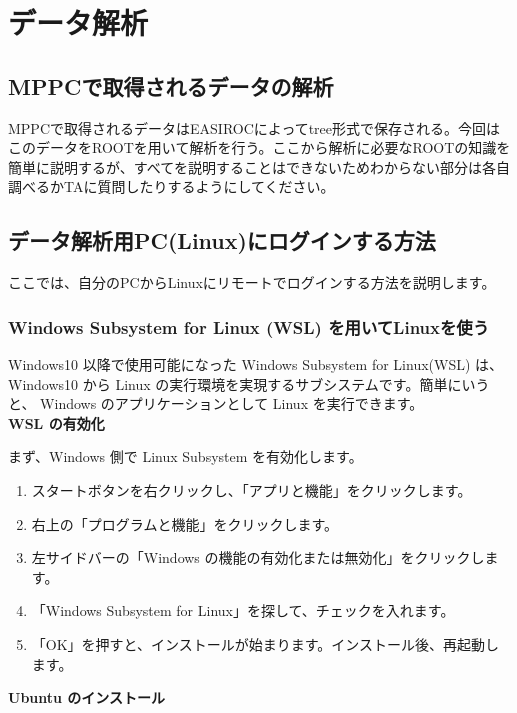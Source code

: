 \documentclass[10pt,a4j]{jarticle}
\begin{document}
\section{データ解析}
\subsection{MPPCで取得されるデータの解析}
MPPCで取得されるデータはEASIROCによってtree形式で保存される。今回はこのデータをROOTを用いて解析を行う。ここから解析に必要なROOTの知識を簡単に説明するが、すべてを説明することはできないためわからない部分は各自調べるかTAに質問したりするようにしてください。

\subsection{データ解析用PC(Linux)にログインする方法}
ここでは、自分のPCからLinuxにリモートでログインする方法を説明します。

\subsubsection{Windows Subsystem for Linux (WSL) を用いてLinuxを使う}
Windows10 以降で使用可能になった Windows Subsystem for Linux(WSL) は、 Windows10 から Linux の実行環境を実現するサブシステムです。簡単にいうと、 Windows のアプリケーションとして Linux を実行できます。\\

\vspace{1cm}
{\Large \bf WSL の有効化}
\vspace{0.5cm}

まず、Windows 側で Linux Subsystem を有効化します。
\begin{enumerate}
\item スタートボタンを右クリックし、「アプリと機能」をクリックします。
\item 右上の「プログラムと機能」をクリックします。
\item 左サイドバーの「Windows の機能の有効化または無効化」をクリックします。
\item 「Windows Subsystem for Linux」を探して、チェックを入れます。
\item 「OK」を押すと、インストールが始まります。インストール後、再起動します。
\end{enumerate}

\vspace{1cm}
{\Large \bf Ubuntu のインストール}
\vspace{0.5cm}
\end{document}
